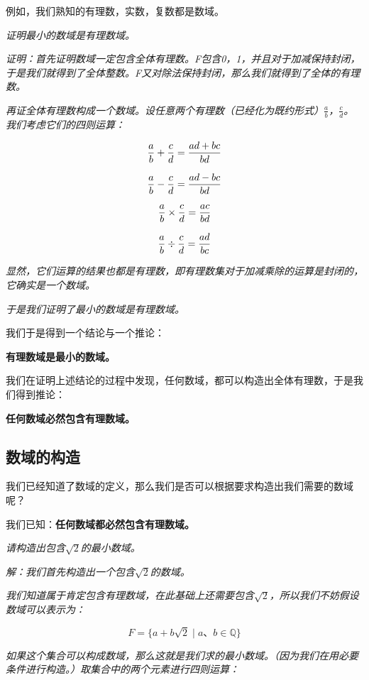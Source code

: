 \documentclass[a4paper]{ctexart}
\begin{document}
例如，我们熟知的有理数，实数，复数都是数域。

\textit{证明最小的数域是有理数域。}

\textit{证明：首先证明数域一定包含全体有理数。F包含0，1，并且对于加减保持封闭，于是我们就得到了全体整数。F又对除法保持封闭，那么我们就得到了全体的有理数。}

\textit{再证全体有理数构成一个数域。设任意两个有理数（已经化为既约形式）$\frac{a}{b}$，$\frac{c}{d}$。我们考虑它们的四则运算：}

$$
\frac{a}{b}+\frac{c}{d}=\frac{ad+bc}{bd}\\
$$

$$
\frac{a}{b}-\frac{c}{d}=\frac{ad-bc}{bd}\\
$$

$$
\frac{a}{b}\times\frac{c}{d}=\frac{ac}{bd}\\
$$

$$
\frac{a}{b}\div\frac{c}{d}=\frac{ad}{bc}\\
$$

\textit{显然，它们运算的结果也都是有理数，即有理数集对于加减乘除的运算是封闭的，它确实是一个数域。}

\textit{于是我们证明了最小的数域是有理数域。}

我们于是得到一个结论与一个推论：

\textbf{有理数域是最小的数域。}

我们在证明上述结论的过程中发现，任何数域，都可以构造出全体有理数，于是我们得到推论：

\textbf{任何数域必然包含有理数域。}

\subsection{数域的构造}
我们已经知道了数域的定义，那么我们是否可以根据要求构造出我们需要的数域呢？

我们已知：\textbf{任何数域都必然包含有理数域。}

\textit{请构造出包含$\sqrt{2}$的最小数域。}

\textit{解：我们首先构造出一个包含$\sqrt{2}$的数域。}

\textit{我们知道属于肯定包含有理数域，在此基础上还需要包含$\sqrt{2}$，所以我们不妨假设数域可以表示为：}

$$
F=\{a+b\sqrt{2}\mid a、b\in\mathbb{Q} \}
$$

\textit{如果这个集合可以构成数域，那么这就是我们求的最小数域。（因为我们在用必要条件进行构造。）取集合中的两个元素进行四则运算：}
\end{document}
